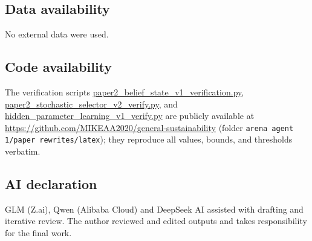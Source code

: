 \documentclass[10pt,twocolumn]{article}
\theoremstyle{plain}
\theoremstyle{definition}
\theoremstyle{remark}
\begin{document}
\subsection*{Data availability}
No external data were used.

\subsection*{Code availability}
The verification scripts
\url{paper2_belief_state_v1_verification.py},
\url{paper2_stochastic_selector_v2_verify.py}, and
\url{hidden_parameter_learning_v1_verify.py} are publicly available at
\url{https://github.com/MIKEAA2020/general-sustainability} (folder
\texttt{arena agent 1/paper rewrites/latex}); they reproduce all
values, bounds, and thresholds verbatim.

\subsection*{AI declaration}
GLM (Z.ai), Qwen (Alibaba Cloud) and DeepSeek AI assisted with drafting
and iterative review. The author reviewed and edited outputs and takes
responsibility for the final work.
\end{document}
